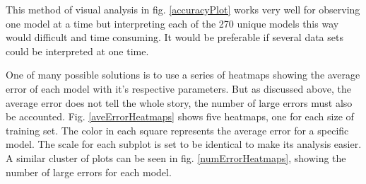 \par This method of visual analysis in fig. \ref{accuracyPlot} works very well for observing one model at a time but interpreting each of the 270 unique models this way would difficult and time consuming. It would be preferable if several data sets could be interpreted at one time.
\par One of many possible solutions is to use a series of heatmaps showing the average error of each model with it's respective parameters. But as discussed above, the average error does not tell the whole story, the number of large errors must also be accounted. Fig. \ref{aveErrorHeatmaps} shows five heatmaps, one for each size of training set. The color in each square represents the average error for a specific model. The scale for each subplot is set to be identical to make its analysis easier. A similar cluster of plots can be seen in fig. \ref{numErrorHeatmaps}, showing the number of large errors for each model. 

